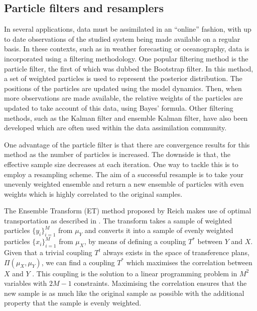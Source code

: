 \documentclass[final]{siamltex}
\begin{document}
\subsection{Particle filters and resamplers}\label{sec:filters}
In several applications, data must be assimilated in an ``online''
fashion, with up to date observations of the studied system being made
available on a regular basis. In these contexts, such as in weather forecasting or
oceanography, data is incorporated using a filtering
methodology. One popular filtering method is the particle filter, the
first of which was dubbed the Bootstrap
filter\cite{gordon1993novel}. In this method, a set of weighted particles is
used to represent the posterior distribution. The positions of the
particles are updated using the model dynamics. Then, when more
observations are made available, the relative weights of the particles
are updated to take account of this data, using Bayes' formula. Other filtering methods, such
as the Kalman filter\cite{kalman1960new} and ensemble Kalman filter\cite{evensen1994sequential}, have also been developed which are often used within the data
assimilation community.

One advantage of the particle filter is that there are convergence
results for this method as the number of particles is increased. The
downside is that, the effective sample size decreases at each iteration. One way to tackle
this is to employ a resampling scheme. The aim of a successful
resample is to take your unevenly weighted ensemble and return a new
ensemble of particles with even weights which is highly correlated to the original samples.

The Ensemble Transform (ET) method proposed by Reich \cite{reich2013nonparametric} makes use of optimal transportation as described in \cite{villani2003topics,villani2008optimal}. The transform takes a sample of weighted particles $\{y_i\}_{i=1}^M$ from $\mu_Y$ and converts it into a sample of evenly weighted particles $\{x_i\}_{i=1}^M$ from $\mu_X$, by means of defining a coupling $T^*$ between $Y$ and $X$. Given that a trivial coupling $T^t$ always exists in the space of transference plans, $\Pi(\mu_{X}, \mu_{Y})$, we can find a coupling $T^*$ which maximises the correlation between $X$ and $Y$ \cite{cotter2012ensemble}. This coupling is the solution to a linear programming problem in $M^2$ variables with $2M-1$ constraints. Maximising the correlation ensures that the new sample is as much like the original sample as possible with the additional property that the sample is evenly weighted.
\end{document}
